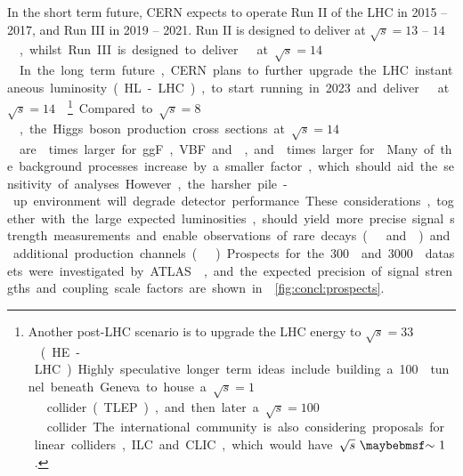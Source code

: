 
In the short term future, CERN expects to operate Run II of the LHC in 2015 -- 2017, and 
Run III in 2019 -- 2021. Run II is designed to deliver \unit{}{\invfb} at 
\unit{$\sqrt{s} = 13\text{ -- }14$}{\TeV}, whilst Run III is designed to deliver 
\unit{}{\invfb} at \unit{$\sqrt{s} = 14$}{\TeV}. In the long term future, CERN 
plans to further upgrade the LHC instantaneous luminosity (HL-LHC), to start running in 
2023 and deliver \unit{}{\invfb} at \unit{$\sqrt{s} = 14$}{\TeV}.\footnote{
	Another post-LHC scenario is to upgrade the LHC energy to \unit{$\sqrt{s} = 33$}{\TeV} 
	(HE-LHC). Highly speculative longer term ideas include building a 
	\unit{100}{\kilo\metre} tunnel beneath Geneva to house a \unit{$\sqrt{s} = 1$}{\TeV} 
	\epluseminus collider (TLEP), and then later a \unit{$\sqrt{s} = 100$}{\TeV} \pp 
	collider. The international community is also considering proposals for \epluseminus 
	linear colliders, ILC and CLIC, which would have \unit{$\sqrt{s}~\about~1$}{\TeV}.
}

Compared to \unit{$\sqrt{s} = 8$}{\TeV}, the Higgs boson production cross sections at 
\unit{$\sqrt{s} = 14$}{\TeV} are  times larger for ggF, VBF and \VH, and 
 times larger for \ttH. Many of the background processes increase by a smaller 
factor, which should aid the sensitivity of analyses. However, the harsher pile-up 
environment will degrade detector performance. These considerations, together with the 
large expected luminosities, should yield more precise signal strength measurements and 
enable observations of rare decays (\eg \HepProcess{\PHiggs \HepTo \PZ\Pphoton} and 
\HepProcess{\PHiggs \HepTo \Pmu\Pmu}) and additional production channels (\eg \ttH). 
Prospects for the \unit{300}{\invfb} and \unit{3000}{\invfb} datasets were investigated by 
ATLAS \cite{ATLAS:prospects}, and the expected precision of signal strengths and coupling 
scale factors are shown in \Figure~\ref{fig:concl:prospects}.

